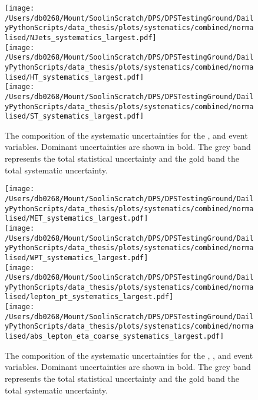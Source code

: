 \begin{figure*}[hp]
	\centering
	\texttt{[image: /Users/db0268/Mount/SoolinScratch/DPS/DPSTestingGround/DailyPythonScripts/data\_thesis/plots/systematics/combined/normalised/NJets\_systematics\_largest.pdf]} \\
	\texttt{[image: /Users/db0268/Mount/SoolinScratch/DPS/DPSTestingGround/DailyPythonScripts/data\_thesis/plots/systematics/combined/normalised/HT\_systematics\_largest.pdf]} \\
	\texttt{[image: /Users/db0268/Mount/SoolinScratch/DPS/DPSTestingGround/DailyPythonScripts/data\_thesis/plots/systematics/combined/normalised/ST\_systematics\_largest.pdf]} \\
	\caption[The composition of the systematic uncertainties for the \NJET{}, \HT{} and \ST{} event variables. Dominant uncertainties are shown in bold. The grey band represents the total statistical uncertainty and the gold band the total systematic uncertainty.]{The composition of the systematic uncertainties for the \NJET{}, \HT{} and \ST{} event variables. Dominant uncertainties are shown in bold. The grey band represents the total statistical uncertainty and the gold band the total systematic uncertainty.}
	\label{fig:Systnorm1}
\end{figure*}
\begin{figure*}[hp]
	\centering
	\texttt{[image: /Users/db0268/Mount/SoolinScratch/DPS/DPSTestingGround/DailyPythonScripts/data\_thesis/plots/systematics/combined/normalised/MET\_systematics\_largest.pdf]} \\
	\texttt{[image: /Users/db0268/Mount/SoolinScratch/DPS/DPSTestingGround/DailyPythonScripts/data\_thesis/plots/systematics/combined/normalised/WPT\_systematics\_largest.pdf]} \\
	\texttt{[image: /Users/db0268/Mount/SoolinScratch/DPS/DPSTestingGround/DailyPythonScripts/data\_thesis/plots/systematics/combined/normalised/lepton\_pt\_systematics\_largest.pdf]} \\
	\texttt{[image: /Users/db0268/Mount/SoolinScratch/DPS/DPSTestingGround/DailyPythonScripts/data\_thesis/plots/systematics/combined/normalised/abs\_lepton\_eta\_coarse\_systematics\_largest.pdf]} \\
	\caption[The composition of the systematic uncertainties for the \ptmiss{}, \WPT{}, \LPT{} and \LETA{} event variables. Dominant uncertainties are shown in bold. The grey band represents the total statistical uncertainty and the gold band the total systematic uncertainty.]{The composition of the systematic uncertainties for the \ptmiss{}, \WPT{}, \LPT{} and \LETA{} event variables. Dominant uncertainties are shown in bold. The grey band represents the total statistical uncertainty and the gold band the total systematic uncertainty.}
	\label{fig:Systnorm2}
\end{figure*}

